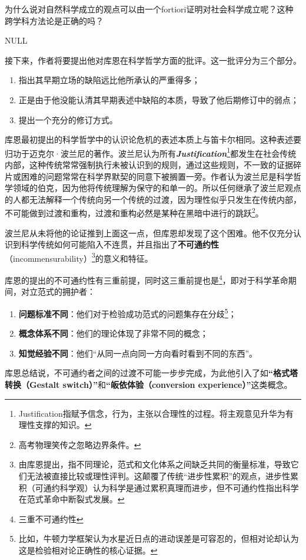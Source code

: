 \documentclass[12pt, a4paper, oneside]{ctexart}
\renewcommand{\b}{\textbf}
\newcommand{\f}{\footnote}
\newcommand{\q}[1]{\begin{questionbox}{}#1\end{questionbox}}
\newcommand{\ans}[1]{\begin{ansbox}{}#1\end{ansbox}}
\newcounter{question}[section]
\newcounter{ans}[section]
\begin{document}
\q{为什么说对自然科学成立的观点可以由一个fortiori证明对社会科学成立呢？这种跨学科方法论是正确的吗？}
\ans{NULL}

接下来，作者将要提出他对库恩在科学哲学方面的批评。这一批评分为三个部分。
\begin{enumerate}
    \item 指出其早期立场的缺陷远比他所承认的严重得多；
    \item 正是由于他没能认清其早期表述中缺陷的本质，导致了他后期修订中的弱点；
    \item 提出一个充分的修订方式。
\end{enumerate}

库恩最初提出的科学哲学中的认识论危机的表述本质上与笛卡尔相同。这种表述要归功于迈克尔·波兰尼的著作。波兰尼认为所有\textit{\b{Justification}}\f{Justification指赋予信念，行为，主张以合理性的过程。将主观意见升华为有理性支撑的知识。}都发生在社会传统内部，这种传统常常强制执行未被认识到的规则，通过这些规则，不一致的证据碎片或困难的问题常常在科学界默契的同意下被搁置一旁。作者认为波兰尼是科学哲学领域的伯克，因为他将传统理解为保守的和单一的。所以任何继承了波兰尼观点的人都无法解释一个传统向另一个传统的过渡，因为理性似乎只发生在传统内部，不可能做到过渡和重构，过渡和重构必然是某种在黑暗中进行的跳跃\f{高考物理笑传之忽略边界条件。}。

波兰尼从未将他的论证推到上面这一点，但库恩却发现了这个困难。他不仅充分认识到科学传统如何可能陷入不连贯，并且指出了\b{不可通约性}（incommensurability）\f{由库恩提出，指不同理论，范式和文化体系之间缺乏共同的衡量标准，导致它们无法被直接比较或理性评判。这颠覆了传统“进步性累积”的观点，进步性累积（可通约科学观）认为科学是通过累积真理而进步，但不可通约性指出科学在范式革命中断裂式发展。}的意义和特征。

库恩的提出的不可通约性有三重前提，同时这三重前提也是\f{三重不可通约性}，即对于科学革命期间，对立范式的拥护者：
\begin{enumerate}
    \item \b{问题标准不同}：他们对于检验成功范式的问题集存在分歧\f{比如，牛顿力学框架认为水星近日点的进动误差是可容忍的，但相对论却认为这是检验相对论正确性的核心证据。}；
    \item \b{概念体系不同}：他们的理论体现了非常不同的概念；
    \item \b{知觉经验不同}：他们“从同一点向同一方向看时看到不同的东西”。
\end{enumerate}

库恩总结说，不可通约者之间的过渡不可能一步步完成，为此他引入了如\b{“格式塔转换（Gestalt switch）”}和\b{“皈依体验（conversion experience）”}这类概念。
\end{document}
